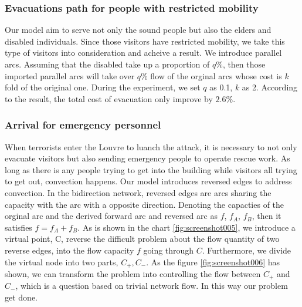 \documentclass{mcmthesis}
\begin{document}
\subsubsection{Evacuations path for people with restricted mobility}

Our model aim to serve not only the sound people  but also the elders and disabled individuals. Since those visitors have restricted mobility, we take this type of visitors into consideration and acheive a result. We introduce parallel arcs. Assuming that the disabled take up a proportion of $q\%$, then those imported parallel arcs will take over $q\%$ flow of the orginal arcs whose cost is $k$ fold of the original one.
During the experiment, we set $q$ as 0.1, $k$ as 2. According to the result, the total cost of evacuation only improve by $2.6\%$.

\subsubsection{Arrival for emergency personnel}
When terrorists enter the Louvre to luanch the attack, it is necessary to not only evacuate visitors but also sending emergency people to operate rescue work.  As long as there is any people trying to get into the building while visitors all trying to get out, convection happens. Our model introduces reversed edges to address convection. In the bidirection network, reversed edges are arcs sharing the capacity with the arc with a opposite direction. Denoting the capacties of the orginal arc and the derived forward arc and reversed arc as $f$, $f_A$, $f_B$, then it satisfies $f = f_A + f_B$. As is shown in the chart \ref{fig:screenshot005}, we introduce a virtual point, C, reverse the difficult problem about the flow quantity of two reverse edges, into the flow capacity $f$ going through $C$. Furthermore, we divide the virtual node into two parts, $C_{+}, C_{-}$. As the figure \ref{fig:screenshot006} has shown, we can transform the problem into controlling the flow between $C_{+}$ and $C_{-}$, which is a question based on trivial network flow. In this way our problem get done.


\begin{figure} 
	\centering 
	\hspace{0.2in} 
\end{figure}
\end{document}
